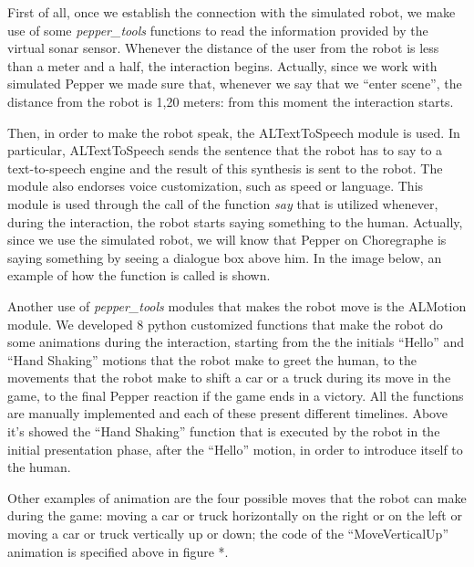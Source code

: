 \documentclass{article}
\begin{document}
\noindent First of all, once we establish the connection with the simulated robot, we make use of some \textit{pepper\_tools} functions to read the information provided by the virtual sonar sensor. Whenever the distance of the user from the robot is less  than a meter and a half, the interaction begins. Actually, since we work with simulated Pepper we made sure that, whenever we say that we “enter scene”, the distance from the robot is 1,20 meters: from this moment the interaction starts.



\noindent Then, in order to make the robot speak, the ALTextToSpeech module is used. In particular, ALTextToSpeech sends the sentence that the robot has to say to a text-to-speech engine and the result of this synthesis is sent to the robot. The module also endorses voice customization, such as speed or language. This module is used through the call of the function \textit{say} that is utilized whenever, during the interaction, the robot starts saying something to the human. Actually, since we use the simulated robot, we will know that Pepper on Choregraphe is saying something by seeing a dialogue box above him. In the image below, an example of how the function is called is shown. 



\noindent Another use of \textit{pepper\_tools} modules that makes the robot move is the ALMotion module. We developed 8 python customized functions that make the robot do some animations during the interaction, starting from the the initials “Hello” and “Hand Shaking”  motions that the robot make to greet the human, to the movements that the robot make to shift a car or a truck during its move in the game, to the final Pepper reaction if the game ends in a victory. All the functions are manually implemented and each of these present different timelines. Above it’s showed the “Hand Shaking” function that is executed by the robot in the initial presentation phase, after the “Hello” motion, in order to introduce itself to the human. 



Other examples of animation are the four possible moves that the robot can make during the game: moving a car or truck horizontally on the right or on the left or moving a car or truck vertically up or down; the code of the “MoveVerticalUp” animation is specified above in figure *. 
\end{document}

